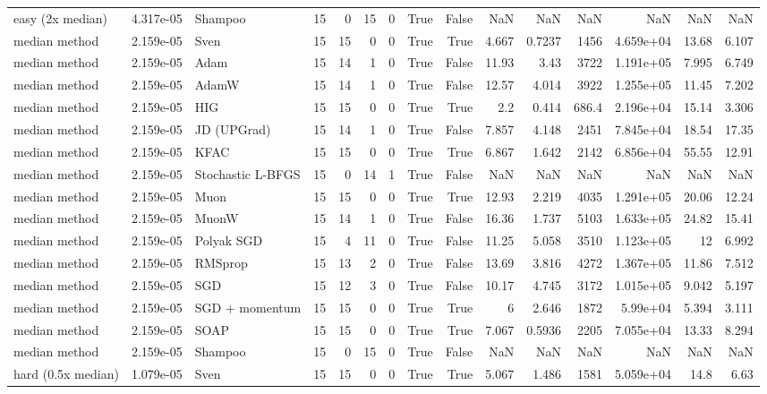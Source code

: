 \begin{tabular}{lrlrrrrrrrrrrrr}
easy (2x median) & 4.317e-05 & Shampoo & 15 & 0 & 15 & 0 & True & False & NaN & NaN & NaN & NaN & NaN & NaN \\
median method & 2.159e-05 & Sven & 15 & 15 & 0 & 0 & True & True & 4.667 & 0.7237 & 1456 & 4.659e+04 & 13.68 & 6.107 \\
median method & 2.159e-05 & Adam & 15 & 14 & 1 & 0 & True & False & 11.93 & 3.43 & 3722 & 1.191e+05 & 7.995 & 6.749 \\
median method & 2.159e-05 & AdamW & 15 & 14 & 1 & 0 & True & False & 12.57 & 4.014 & 3922 & 1.255e+05 & 11.45 & 7.202 \\
median method & 2.159e-05 & HIG & 15 & 15 & 0 & 0 & True & True & 2.2 & 0.414 & 686.4 & 2.196e+04 & 15.14 & 3.306 \\
median method & 2.159e-05 & JD (UPGrad) & 15 & 14 & 1 & 0 & True & False & 7.857 & 4.148 & 2451 & 7.845e+04 & 18.54 & 17.35 \\
median method & 2.159e-05 & KFAC & 15 & 15 & 0 & 0 & True & True & 6.867 & 1.642 & 2142 & 6.856e+04 & 55.55 & 12.91 \\
median method & 2.159e-05 & Stochastic L-BFGS & 15 & 0 & 14 & 1 & True & False & NaN & NaN & NaN & NaN & NaN & NaN \\
median method & 2.159e-05 & Muon & 15 & 15 & 0 & 0 & True & True & 12.93 & 2.219 & 4035 & 1.291e+05 & 20.06 & 12.24 \\
median method & 2.159e-05 & MuonW & 15 & 14 & 1 & 0 & True & False & 16.36 & 1.737 & 5103 & 1.633e+05 & 24.82 & 15.41 \\
median method & 2.159e-05 & Polyak SGD & 15 & 4 & 11 & 0 & True & False & 11.25 & 5.058 & 3510 & 1.123e+05 & 12 & 6.992 \\
median method & 2.159e-05 & RMSprop & 15 & 13 & 2 & 0 & True & False & 13.69 & 3.816 & 4272 & 1.367e+05 & 11.86 & 7.512 \\
median method & 2.159e-05 & SGD & 15 & 12 & 3 & 0 & True & False & 10.17 & 4.745 & 3172 & 1.015e+05 & 9.042 & 5.197 \\
median method & 2.159e-05 & SGD + momentum & 15 & 15 & 0 & 0 & True & True & 6 & 2.646 & 1872 & 5.99e+04 & 5.394 & 3.111 \\
median method & 2.159e-05 & SOAP & 15 & 15 & 0 & 0 & True & True & 7.067 & 0.5936 & 2205 & 7.055e+04 & 13.33 & 8.294 \\
median method & 2.159e-05 & Shampoo & 15 & 0 & 15 & 0 & True & False & NaN & NaN & NaN & NaN & NaN & NaN \\
hard (0.5x median) & 1.079e-05 & Sven & 15 & 15 & 0 & 0 & True & True & 5.067 & 1.486 & 1581 & 5.059e+04 & 14.8 & 6.63 \\

\end{tabular}
